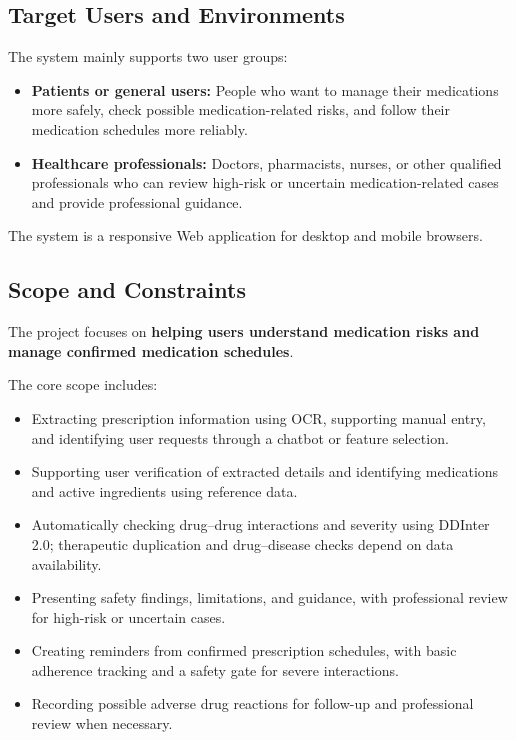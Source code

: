 \subsection{Target Users and Environments}

The system mainly supports two user groups:

\begin{itemize}
    \item \textbf{Patients or general users:}
    People who want to manage their medications more safely, check possible medication-related risks, and follow their medication schedules more reliably.

    \item \textbf{Healthcare professionals:}
    Doctors, pharmacists, nurses, or other qualified professionals who can review high-risk or uncertain medication-related cases and provide professional guidance.
\end{itemize}

The system is a responsive Web application for desktop and mobile browsers.

\subsection{Scope and Constraints}

The project focuses on \textbf{helping users understand medication risks and manage confirmed medication schedules}.

The core scope includes:

\begin{itemize}
    \item Extracting prescription information using OCR, supporting manual entry, and identifying user requests through a chatbot or feature selection.

    \item Supporting user verification of extracted details and identifying medications and active ingredients using reference data.

    \item Automatically checking drug--drug interactions and severity using DDInter 2.0; therapeutic duplication and drug--disease checks depend on data availability.

    \item Presenting safety findings, limitations, and guidance, with professional review for high-risk or uncertain cases.

    \item Creating reminders from confirmed prescription schedules, with basic adherence tracking and a safety gate for severe interactions.

    \item Recording possible adverse drug reactions for follow-up and professional review when necessary.
\end{itemize}

